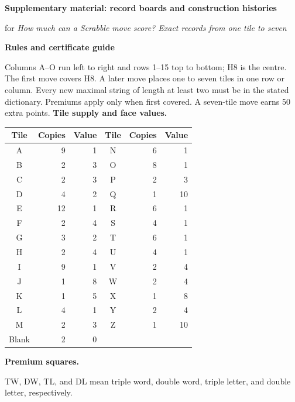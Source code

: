 \documentclass[letterpaper]{article}
\begin{document}
\begin{center}
{\fontsize{15}{17}\selectfont\bfseries Supplementary material: record boards and construction histories\par}
\vspace{2pt}
{\fontsize{9}{10}\selectfont for \textit{How much can a Scrabble move score? Exact records from one tile to seven}\par}
\vspace{5pt}
{\fontsize{12}{14}\selectfont\bfseries Rules and certificate guide\par}
\vspace{4pt}
\end{center}
{\fontsize{9}{10}\selectfont
Columns A--O run left to right and rows 1--15 top to bottom; H8 is the centre. The first move covers H8. A later move places one to seven tiles in one row or column. Every new maximal string of length at least two must be in the stated dictionary. Premiums apply only when first covered. A seven-tile move earns 50 extra points.
\vspace{5pt}
\textbf{Tile supply and face values.}\par\vspace{2pt}
\begin{center}\begin{tabular}{@{}crr@{\qquad}crr@{}}\toprule
Tile&Copies&Value&Tile&Copies&Value\\\midrule
A&9&1&N&6&1\\ B&2&3&O&8&1\\ C&2&3&P&2&3\\ D&4&2&Q&1&10\\
E&12&1&R&6&1\\ F&2&4&S&4&1\\ G&3&2&T&6&1\\ H&2&4&U&4&1\\
I&9&1&V&2&4\\ J&1&8&W&2&4\\ K&1&5&X&1&8\\ L&4&1&Y&2&4\\
M&2&3&Z&1&10\\ Blank&2&0&&&\\\bottomrule\end{tabular}\end{center}
\vspace{4pt}\textbf{Premium squares.}\par\vspace{2pt}
TW, DW, TL, and DL mean triple word, double word, triple letter, and double letter, respectively.\par\vspace{2pt}
}
\end{document}
